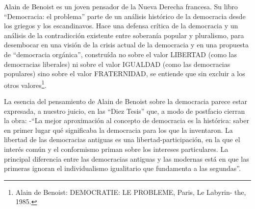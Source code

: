 \documentclass[
]{book}
\begin{document}
Alain de Benoist es un joven pensador de la Nueva Derecha francesa. Su libro ``Democracia: el problema'' parte de un análisis histórico de la democracia desde los griegos y los escandinavos. Hace una defensa crítica de la democracia y un análisis de la contradicción existente entre soberanía popular y pluralismo, para desembocar en una visión de la crisis actual de la democracia y en una propuesta de ``democracia orgánica'', construída no sobre el valor LIBERTAD (como las democracias liberales) ni sobre el valor IGUALDAD (como las democracias populares) sino sobre el valor FRATERNIDAD, se entiende que sin excluir a los otros valores\footnote{Alain de Benoist: DEMOCRATIE: LE PROBLEME, Paris, Le Labyrin- the, 1985.}.

La esencia del pensamiento de Alain de Benoist sobre la democracia parece estar expresada, a nuestro juicio, en las ``Diez Tesis'' que, a modo de postfacio cierran la obra: -``La mejor aproximación al concepto de democracia es la histórica: saber en primer lugar qué significaba la democracia para los que la inventaron. La libertad de las democracias antiguas es una libertad-participación, en la que el interés común y el conformismo priman sobre los intereses particulares. La principal diferencia entre las democracias antiguas y las modernas está en que las primeras ignoran el individualismo igualitario que fundamenta a las segundas''.
\end{document}
